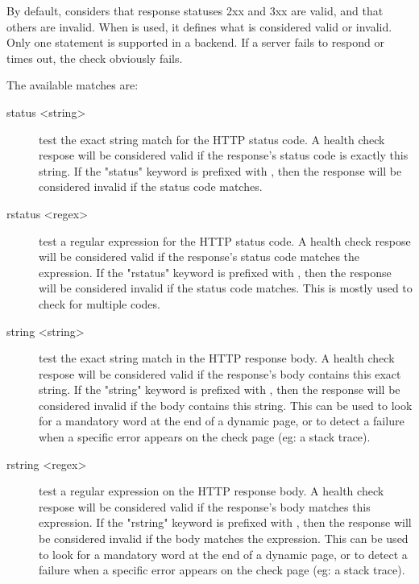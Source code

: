   By default,  considers that response statuses 2xx and 3xx
  are valid, and that others are invalid. When  is used,
  it defines what is considered valid or invalid. Only one 
  statement is supported in a backend. If a server fails to respond or times
  out, the check obviously fails.
  
  The available matches are:
  
  \begin{description}
  \item[status <string>]
                      test the exact string match for the HTTP status code.
                      A health check respose will be considered valid if the
                      response's status code is exactly this string. If the
                      "status" keyword is prefixed with \chr{!}, then the response
                      will be considered invalid if the status code matches.

    \item[rstatus <regex>]
                      test a regular expression for the HTTP status code.
                      A health check respose will be considered valid if the
                      response's status code matches the expression. If the
                      "rstatus" keyword is prefixed with \chr{!}, then the response
                      will be considered invalid if the status code matches.
                      This is mostly used to check for multiple codes.

    \item[string <string>]
                      test the exact string match in the HTTP response body.
                      A health check respose will be considered valid if the
                      response's body contains this exact string. If the
                      "string" keyword is prefixed with \chr{!}, then the response
                      will be considered invalid if the body contains this
                      string. This can be used to look for a mandatory word at
                      the end of a dynamic page, or to detect a failure when a
                      specific error appears on the check page (eg: a stack
                      trace).

    \item[rstring <regex>]
                      test a regular expression on the HTTP response body.
                      A health check respose will be considered valid if the
                      response's body matches this expression. If the "rstring"
                      keyword is prefixed with \chr{!}, then the response will be
                      considered invalid if the body matches the expression.
                      This can be used to look for a mandatory word at the end
                      of a dynamic page, or to detect a failure when a specific
                      error appears on the check page (eg: a stack trace).
  \end{description}


